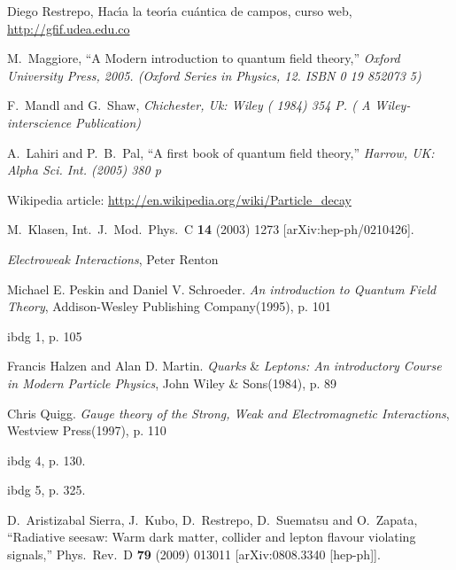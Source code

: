 \begin{thebibliography}{99}
 Diego Restrepo, Hac\'\i a la teor\'\i a cu\'antica de campos, curso web, \url{http://gfif.udea.edu.co}

  M.~Maggiore,
  ``A Modern introduction to quantum field theory,''
{\it  Oxford University Press, 2005. (Oxford Series in Physics, 12. ISBN 0 19 852073 5)}

  F.~Mandl and G.~Shaw,
{\it  Chichester, Uk: Wiley ( 1984) 354 P. ( A Wiley-interscience Publication)}

  A.~Lahiri and P.~B.~Pal,
  ``A first book of quantum field theory,''
{\it  Harrow, UK: Alpha Sci. Int. (2005) 380 p}


 Wikipedia article: \url{http://en.wikipedia.org/wiki/Particle_decay}

  M.~Klasen,
  Int.\ J.\ Mod.\ Phys.\  C {\bf 14} (2003) 1273
  [arXiv:hep-ph/0210426].

 \emph{Electroweak Interactions}, Peter Renton


Michael E. Peskin and Daniel V. Schroeder. \emph{An introduction to
Quantum Field Theory}, Addison-Wesley Publishing Company(1995), p.
101

ibdg 1, p. 105

Francis Halzen and Alan D. Martin. \emph{Quarks} \& \emph{Leptons:
An introductory Course in Modern Particle Physics}, John Wiley \&
Sons(1984), p. 89

Chris Quigg. \emph{Gauge theory of the Strong, Weak and
Electromagnetic Interactions}, Westview Press(1997), p. 110


ibdg 4, p. 130.

ibdg 5, p. 325.


  D.~Aristizabal Sierra, J.~Kubo, D.~Restrepo, D.~Suematsu and O.~Zapata,
  ``Radiative seesaw: Warm dark matter, collider and lepton flavour violating
  signals,''
  Phys.\ Rev.\  D {\bf 79} (2009) 013011
  [arXiv:0808.3340 [hep-ph]].


\end{thebibliography}
